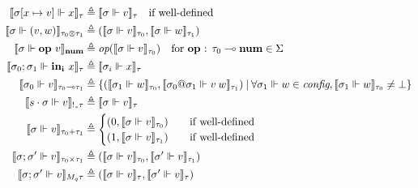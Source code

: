 \begin{definition}
\begin{equation}
\begin{aligned}[c]
  \llbracket \sigma [x \mapsto v] \Vdash x \rrbracket_{\tau} &\triangleq
    \llbracket \sigma \Vdash v \rrbracket_{\tau} \quad \text{if well-defined} \\
  \llbracket \sigma \Vdash (v, w) \rrbracket_{\tau_0 \otimes \tau_1} &\triangleq
    (\llbracket \sigma \Vdash v \rrbracket_{\tau_0}, \llbracket \sigma \Vdash w
    \rrbracket_{\tau_1}) \\
  \llbracket \sigma \Vdash \mathbf{op} \ v \rrbracket_{\textbf{num}}
    &\triangleq \textit{op} (\llbracket \sigma \Vdash v \rrbracket_{\tau_0})
    \quad \text{for \textbf{op} : $\tau_0 \multimap \textbf{num} \in \Sigma$} \\
  \llbracket \sigma_0; \sigma_1 \Vdash \mathbf{in_i} \ x \rrbracket_{\tau}
    &\triangleq \llbracket \sigma_i \Vdash x \rrbracket_{\tau} \\
  \llbracket \sigma_0 \Vdash v \rrbracket_{\tau_0 \multimap \tau_1}
    &\triangleq \{ (\llbracket \sigma_1 \Vdash w \rrbracket_{\tau_0}, \llbracket
    \sigma_0 @ \sigma_1 \Vdash v \> w \rrbracket_{\tau_1}) \> | \>
    \forall \sigma_1 \Vdash w \in \textit{config}, \llbracket \sigma_1 \Vdash w
    \rrbracket_{\tau_0} \not= \bot \} \\
    \llbracket s \cdot \sigma \Vdash v \rrbracket_{!_s \tau} &\triangleq \llbracket
    \sigma \Vdash v \rrbracket_\tau \\
  \llbracket \sigma \Vdash v \rrbracket_{\tau_0 + \tau_1} &\triangleq
    \begin{cases}
      (0, \llbracket \sigma \Vdash v \rrbracket_{\tau_0}) \quad &\text{if well-defined} \\
      (1, \llbracket \sigma \Vdash v \rrbracket_{\tau_1}) \quad &\text{if well-defined}
    \end{cases} \\
  \llbracket \sigma; \sigma' \Vdash v \rrbracket_{\tau_0 \times \tau_1}
    &\triangleq (\llbracket \sigma \Vdash v \rrbracket_{\tau_0}, \llbracket
    \sigma' \Vdash v \rrbracket_{\tau_1}) \\
  \llbracket \sigma; \sigma' \Vdash v \rrbracket_{M_q \tau} &\triangleq
    (\llbracket \sigma \Vdash v \rrbracket_{\tau}, \llbracket \sigma' \Vdash v
    \rrbracket_{\tau}) \\

\end{aligned}
\end{equation}
\end{definition}
